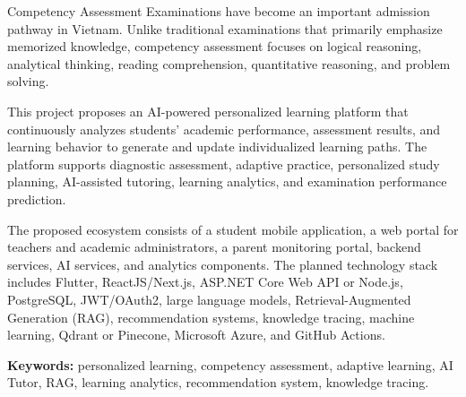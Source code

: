 Competency Assessment Examinations have become an important admission pathway in Vietnam. Unlike traditional examinations that primarily emphasize memorized knowledge, competency assessment focuses on logical reasoning, analytical thinking, reading comprehension, quantitative reasoning, and problem solving.

This project proposes an AI-powered personalized learning platform that continuously analyzes students' academic performance, assessment results, and learning behavior to generate and update individualized learning paths. The platform supports diagnostic assessment, adaptive practice, personalized study planning, AI-assisted tutoring, learning analytics, and examination performance prediction.

The proposed ecosystem consists of a student mobile application, a web portal for teachers and academic administrators, a parent monitoring portal, backend services, AI services, and analytics components. The planned technology stack includes Flutter, ReactJS/Next.js, ASP.NET Core Web API or Node.js, PostgreSQL, JWT/OAuth2, large language models, Retrieval-Augmented Generation (RAG), recommendation systems, knowledge tracing, machine learning, Qdrant or Pinecone, Microsoft Azure, and GitHub Actions.

\textbf{Keywords:} personalized learning, competency assessment, adaptive learning, AI Tutor, RAG, learning analytics, recommendation system, knowledge tracing.

\tableofcontents
\listoffigures
\listoftables

\clearpage
{}
\hypersetup{pageanchor=true}

